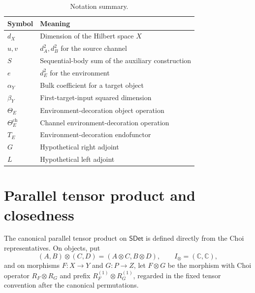 \documentclass[11pt,a4paper]{article}
\theoremstyle{definition}
\theoremstyle{plain}
\theoremstyle{remark}
\newcommand{\SDet}{\mathsf{SDet}}
\begin{document}
\begin{table}[ht]
\centering
\begin{tabular}{ll}
\toprule
Symbol & Meaning\\
\midrule
$d_X$ & Dimension of the Hilbert space $X$\\
$u,v$ & $d_A^2,d_B^2$ for the source channel\\
$S$ & Sequential-body sum of the auxiliary construction\\
$e$ & $d_E^2$ for the environment\\
$\alpha_Y$ & Bulk coefficient for a target object\\
$\beta_Y$ & First-target-input squared dimension\\
$\Theta_E$ & Environment-decoration object operation\\
$\Theta_E^{\mathrm{ch}}$ & Channel environment-decoration operation\\
$T_E$ & Environment-decoration endofunctor\\
$G$ & Hypothetical right adjoint\\
$L$ & Hypothetical left adjoint\\
\bottomrule
\end{tabular}
\caption{Notation summary.}
\label{tab:notation}
\end{table}

\section{Parallel tensor product and closedness}

The canonical parallel tensor product on $\SDet$ is defined directly from
the Choi representatives. On objects, put
\[
(A,B)\otimes(C,D)=(A\otimes C,B\otimes D),
\qquad
I_\otimes=(\mathbb C,\mathbb C),
\]
and on morphisms $F:X\to Y$ and $G:P\to Z$, let $F\otimes G$ be the
morphism with Choi operator $R_F\otimes R_G$ and prefix
$R_F^{(1)}\otimes R_G^{(1)}$, regarded in the fixed tensor convention
after the canonical permutations.
\end{document}
